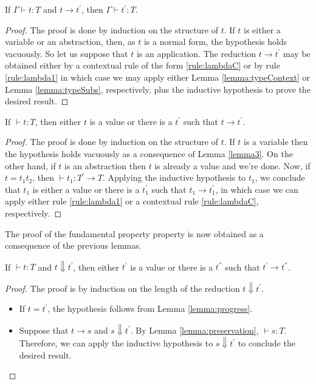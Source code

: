 \begin{lemma}[Preservation]\label{lemma:preservation}
If $\Gamma \vdash t : T$ and $t \to t^{'}$, then $\Gamma \vdash t^{'} : T$.
\end{lemma} 
\begin{proof}
The proof is done by induction on the structure of $t$. If $t$ is either a variable or an abstraction, then, as $t$ is a normal form, the hypothesis holds vacuously. So let us suppose that $t$ is an application. The reduction $t \to t^{'}$ may be obtained either by a contextual rule of the form \eqref{rule:lambdaC} or by rule \eqref{rule:lambda1} in which case we may apply either Lemma \eqref{lemma:typeContext} or Lemma \eqref{lemma:typeSubs}, respectively,  plus the inductive hypothesis to prove the desired result. 
\end{proof}

\begin{lemma}[Progress]\label{lemma:progress}
If $\vdash t: T$, then either $t$ is a value or there is a $t^{'}$ such that $t \to t^{'}$. 
\end{lemma} 
\begin{proof}
The proof is done by induction on the structure of $t$. If $t$ is a variable then the hypothesis holds vacuously as a consequence of Lemma \eqref{lemma3}.  On the other hand, if $t$ is an abstraction then $t$ is already a value and we're done. Now, if $t = t_1t_2$, then $\vdash t_1 : T^{'} \to T$. Applying the inductive hypothesis to $t_1$, we conclude that $t_1$ is either a value or there is a $t^{'}_1$ such that $t_1 \to t^{'}_1$, in which case we can apply either rule \eqref{rule:lambda1} or a contextual rule \eqref{rule:lambdaC}, respectively. 
\end{proof} 

The proof of the fundamental property property is now obtained as a consequence of the previous lemmas. 

\begin{theorem}[Safety]
If $ \vdash t : T$ and  $t \Downarrow t^{'}$, then either $t^{'}$ is a value or there is a $t^{''}$ such that $t^{'} \to t^{''}$. 
\end{theorem}
\begin{proof}
The proof is by induction on the length of the reduction $t \Downarrow t^{'}$. 
\begin{itemize}
\item If $t = t ^{'}$, the hypothesis follows from Lemma \eqref{lemma:progress}. 
\item Suppose that $t \to s$ and $s \Downarrow t^{'}$. By Lemma \eqref{lemma:preservation}, $\vdash s: T$. Therefore, we can apply the inductive hypothesis to $s \Downarrow t^{'}$ to conclude the desired result. 
\end{itemize}
\end{proof}























